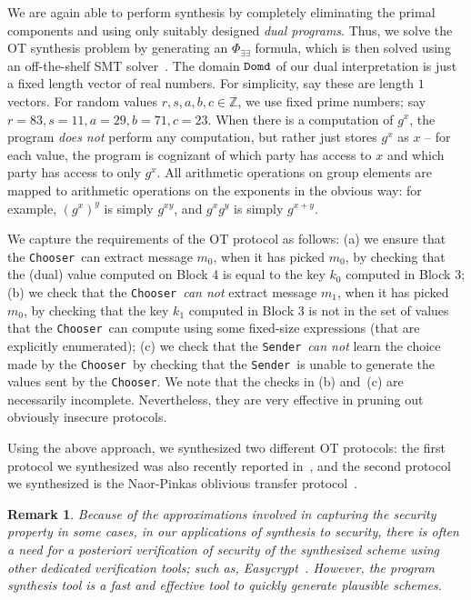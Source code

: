 \documentclass[preprint]{sig-alternate-05-2015}
\newtheorem{remark}{Remark}
\def\sender{{\tt{Sender}}}
\def\chooser{{\tt{Chooser}}}
\def\domd{{\tt{Domd}}}
\begin{document}
We are again able to perform synthesis by completely eliminating the primal components
and using only suitably designed %
{\em{dual programs}}.
Thus, we solve the OT synthesis problem by generating 
an $\Phi_{\exists\exists}$ formula, which is then solved using an
off-the-shelf SMT solver~\cite{yices,z3}.
%
The domain $\domd$ of our dual interpretation is just a fixed length
vector of real numbers. For simplicity, say these are length $1$ vectors.
For random values $r,s,a,b,c\in\mathbb{Z}$, we use fixed prime numbers;
say $r=83,s=11,a=29,b=71,c=23$. 
When there is a computation of $g^x$, the program {\em{does not}} perform any computation,
but rather just stores $g^x$ as $x$ -- for each value, the program is cognizant of
which party has access to $x$ and which party has access to only $g^x$.
All arithmetic operations on group elements are mapped to arithmetic operations
on the exponents in the obvious way: for example, $(g^x)^y$ is simply $g^{xy}$,
and $g^xg^y$ is simply $g^{x+y}$. 

We capture the requirements of the OT protocol as follows:
(a) we ensure that the \chooser\ can extract message $m_0$, when it has picked $m_0$,
by checking that the (dual) value computed on Block 4 is equal to the key $k_0$
computed in Block 3;
(b) we check that the \chooser\ {\em{can not}} extract message $m_1$, when it has picked $m_0$,
by checking that the key $k_1$ computed in Block 3 is not in the set of values that the
\chooser\ can compute using some fixed-size expressions (that are explicitly enumerated);
(c) we check that the \sender\ {\em{can not}} learn the choice made by the \chooser\ by
checking that the \sender\ is unable to generate the values sent by the \chooser.
We note that the checks in (b) and~(c) are necessarily incomplete. Nevertheless, they are
very effective in pruning out obviously insecure protocols.

Using the above approach, we synthesized two different OT protocols:
the first protocol we synthesized was also recently reported in~\cite{SimpleOT},
and the second protocol we synthesized is the Naor-Pinkas oblivious transfer protocol~\cite{Pinkas}.

\begin{remark}
Because of the approximations involved in capturing the security
property in some cases, in our applications of synthesis to security, 
there is often a need for {\em{a posteriori}} verification of security 
of the synthesized scheme using other dedicated verification tools; 
such as, Easycrypt~\cite{easycrypt}. 
However, the program synthesis tool is a fast and effective tool to 
quickly generate plausible schemes.
\end{remark}
\end{document}

